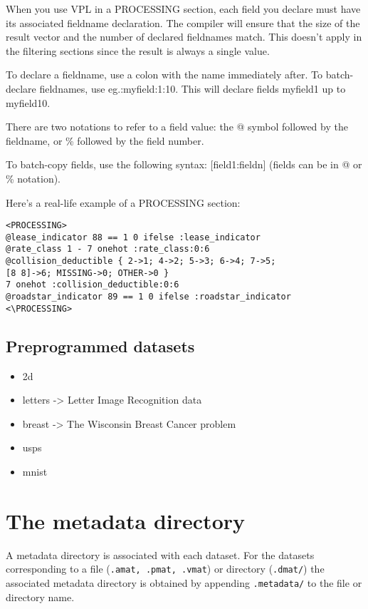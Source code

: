 \documentclass[11pt]{book}
\begin{document}
When you use VPL in a PROCESSING section, each field you declare must have its associated fieldname declaration. The compiler will ensure that the size of the result vector and the number of declared fieldnames match. This doesn't apply in the filtering sections since the result is always a single value. 

To declare a fieldname, use a colon with the name immediately after. To batch-declare fieldnames, use eg.:myfield:1:10. This will declare fields myfield1 up to myfield10.

There are two notations to refer to a field value: the @ symbol followed by the fieldname, or \% followed by the field number.

To batch-copy fields, use the following syntax: [field1:fieldn] (fields can be in @ or \% notation).

Here's a real-life example of a PROCESSING section:

\begin{verbatim}
<PROCESSING>
@lease_indicator 88 == 1 0 ifelse :lease_indicator
@rate_class 1 - 7 onehot :rate_class:0:6
@collision_deductible { 2->1; 4->2; 5->3; 6->4; 7->5; 
[8 8]->6; MISSING->0; OTHER->0 }
7 onehot :collision_deductible:0:6
@roadstar_indicator 89 == 1 0 ifelse :roadstar_indicator
<\PROCESSING>
\end{verbatim}

\subsection{Preprogrammed datasets}

\begin{itemize}
\item 2d
\item letters -> Letter Image Recognition data
\item breast -> The Wisconsin Breast Cancer problem
\item usps
\item mnist
\end{itemize}

\section{The metadata directory}

A metadata directory is associated with each dataset.  For the datasets
corresponding to a file ({\tt .amat, .pmat, .vmat}) or directory ({\tt .dmat/}) the
associated metadata directory is obtained by appending {\tt .metadata/} to the
file or directory name.
\end{document}
